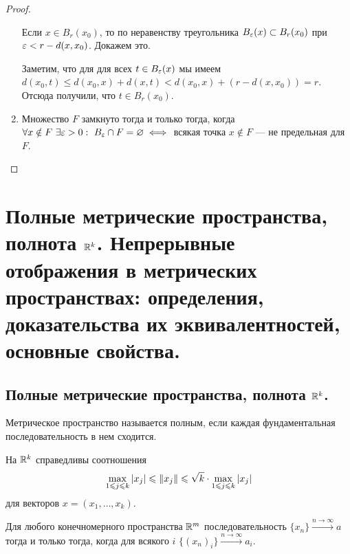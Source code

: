 \documentclass[a4paper]{article}
\theoremstyle{named}
\begin{document}
\begin{lemma*}
\begin{proof}
\begin{enumerate}
                Если $x \in B_r(x_0)$, то по неравенству треугольника $B_{\varepsilon}(x) \subset B_r(x_0)$ при $\varepsilon < r - d(x, x_0)$. Докажем это.

                Заметим, что для для всех $t \in B_{\varepsilon}(x)$ мы имеем $d(x_0, t) \leq d(x_0, x) + d(x, t) < d(x_0, x) + (r - d(x, x_0)) = r$. Отсюда получили, что $t \in B_r(x_0)$.

            \item
                Множество $F$ замкнуто тогда и только тогда, когда $\forall x \notin F \ \exists \varepsilon > 0: \ B_{\varepsilon} \cap F = \varnothing \iff$ всякая точка $x \notin F$ --- не предельная для $F$.
            \end{enumerate}
        \end{proof}
    \end{lemma*}

    \section{Полные метрические пространства, полнота $\mathbb{R}^k$. Непрерывные отображения в метрических пространствах: определения, доказательства их эквивалентностей, основные свойства.}

    \subsection{Полные метрические пространства, полнота $\mathbb{R}^k$.}

    \begin{definition*}
        Метрическое пространство называется полным, если каждая фундаментальная последовательность в нем сходится.
    \end{definition*}

    \begin{remark*}
        На $\mathbb{R}^k$ справедливы соотношения
        \begin{equation*}
            \max\limits_{1 \leqslant j \leqslant k} |x_j| \leqslant \left\lVert x_j\right\rVert \leqslant \sqrt{k} \cdot \max\limits_{1 \leqslant j \leqslant k} |x_j|
        \end{equation*}
        для векторов $x = (x_1, \dots, x_k)$.
    \end{remark*}

    \begin{theorem*}
        Для любого конечномерного пространства $\mathbb{R}^m$ последовательность $\{x_n\} \xrightarrow{n \to \infty} a$ тогда и только тогда, когда для всякого $i$ $\{(x_n)_i\} \xrightarrow{n \to \infty} a_i$.
    \end{theorem*}
\end{document}
